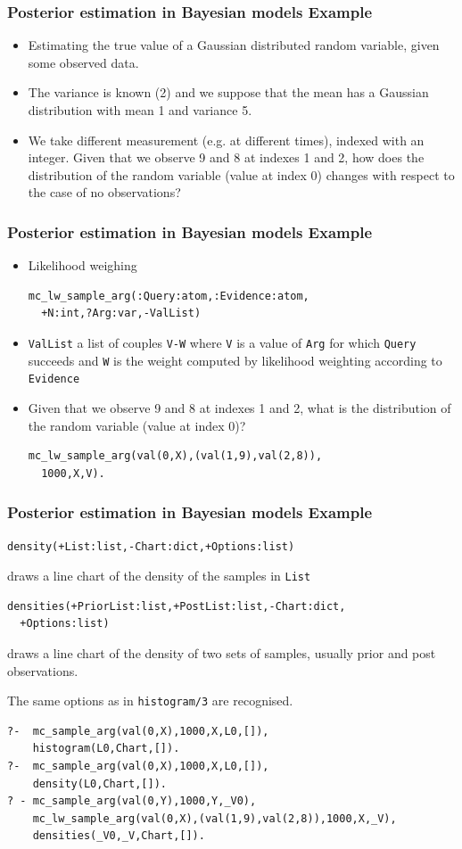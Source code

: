 \documentclass[trans]{beamer}
\begin{document}
\begin{frame}[fragile]
  \frametitle{Posterior estimation in Bayesian models Example}
  \begin{itemize}
\item
Estimating the true value of a Gaussian distributed random variable, given some observed data.
 \item The variance is known (2) and we suppose that the mean has a Gaussian distribution with mean 1 and variance 5.
\item We take different measurement (e.g. at different times), indexed with an integer. Given that we observe 9 and 8 at indexes 1 and 2, how does the distribution of the random variable (value at index 0) changes with respect to the case of no observations?
  \end{itemize}
\end{frame}
\begin{frame}[fragile]
  \frametitle{Posterior estimation in Bayesian models Example}
  \begin{itemize}
\item Likelihood weighing
\begin{verbatim}
mc_lw_sample_arg(:Query:atom,:Evidence:atom,
  +N:int,?Arg:var,-ValList)
\end{verbatim}
\item \verb|ValList| a list of couples \verb|V-W| where \verb|V| is a value of \verb|Arg| for which \verb|Query| succeeds and \verb|W| is the weight computed by likelihood weighting according to \verb|Evidence|
\item Given that we observe 9 and 8 at indexes 1 and 2, what is the distribution of the random variable (value at index 0)?
\begin{verbatim}
mc_lw_sample_arg(val(0,X),(val(1,9),val(2,8)),
  1000,X,V).
\end{verbatim}
  \end{itemize}
\end{frame}
\begin{frame}[fragile]
  \frametitle{Posterior estimation in Bayesian models Example}
   
\begin{verbatim}
density(+List:list,-Chart:dict,+Options:list) 
\end{verbatim}
draws a line chart of the density of the samples in \verb|List| 

   
\begin{verbatim}
densities(+PriorList:list,+PostList:list,-Chart:dict,
  +Options:list)
\end{verbatim}
draws a line chart of the density of two sets of samples, usually prior and post observations. 

 The same options as in \verb|histogram/3|  are recognised.
\begin{scriptsize}
\begin{verbatim}
?-  mc_sample_arg(val(0,X),1000,X,L0,[]),
    histogram(L0,Chart,[]).
?-  mc_sample_arg(val(0,X),1000,X,L0,[]),
    density(L0,Chart,[]).
? - mc_sample_arg(val(0,Y),1000,Y,_V0), 
    mc_lw_sample_arg(val(0,X),(val(1,9),val(2,8)),1000,X,_V),
    densities(_V0,_V,Chart,[]).
\end{verbatim}
\end{scriptsize}
\end{frame}
\end{document}
